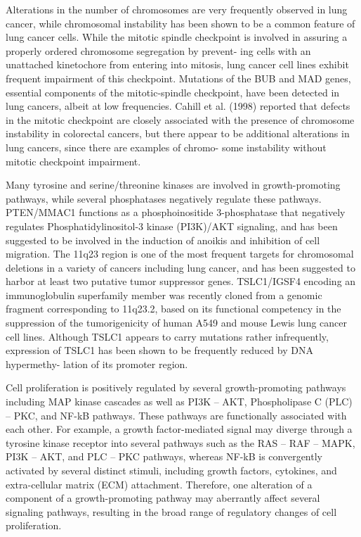        Alterations in the number of chromosomes are very frequently observed in
        lung cancer, while chromosomal instability has been shown to be a common
        feature of lung cancer cells. While the mitotic spindle checkpoint is
        involved in assuring a properly ordered chromosome segregation by
        prevent- ing cells with an unattached kinetochore from entering into
        mitosis, lung cancer cell lines exhibit frequent impairment of this
        checkpoint. Mutations of the BUB and MAD genes, essential components of
        the mitotic-spindle checkpoint, have been detected in lung cancers,
        albeit at low frequencies. Cahill et al. (1998) reported that defects in
        the mitotic checkpoint are closely associated with the presence of
        chromosome instability in colorectal cancers, but there appear to be
        additional alterations in lung cancers, since there are examples of
        chromo- some instability without mitotic checkpoint impairment.

        Many tyrosine and serine/threonine kinases are involved in
        growth-promoting pathways, while several phosphatases negatively
        regulate these pathways. PTEN/MMAC1 functions as a phosphoinositide
        3-phosphatase that negatively regulates Phosphatidylinositol-3 kinase
        (PI3K)/AKT signaling, and has been suggested to be involved in the
        induction of anoikis and inhibition of cell migration. The 11q23 region
        is one of the most frequent targets for chromosomal deletions in a
        variety of cancers including lung cancer, and has been suggested to
        harbor at least two putative tumor suppressor genes. TSLC1/IGSF4
        encoding an immunoglobulin superfamily member was recently cloned from a
        genomic fragment corresponding to 11q23.2, based on its functional
        competency in the suppression of the tumorigenicity of human A549 and
        mouse Lewis lung cancer cell lines. Although TSLC1 appears to carry
        mutations rather infrequently, expression of TSLC1 has been shown to be
        frequently reduced by DNA hypermethy- lation of its promoter region.

        Cell proliferation is positively regulated by several growth-promoting pathways including MAP kinase cascades as well as PI3K – AKT, Phospholipase C (PLC) – PKC, and NF-kB pathways. These pathways are functionally associated with each other. For example, a growth factor-mediated signal may diverge through a tyrosine kinase receptor into several pathways such as the RAS – RAF – MAPK, PI3K – AKT, and PLC – PKC pathways, whereas NF-kB is convergently activated by several distinct stimuli, including growth factors, cytokines, and extra-cellular matrix (ECM) attachment. Therefore, one alteration of a component of a growth-promoting pathway may aberrantly affect several signaling pathways, resulting in the broad range of regulatory changes of cell proliferation.

